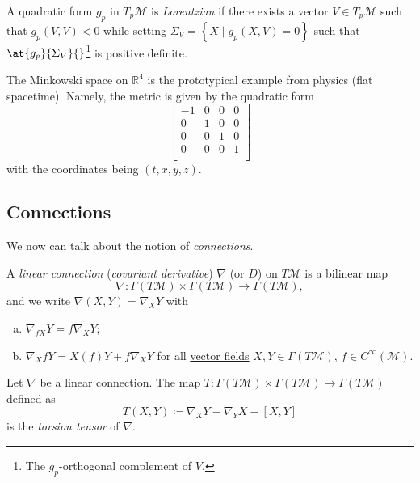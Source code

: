 \begin{definition}[Lorentzian]\label{def:Lorentzian}
	A quadratic form \(g_p\) in \(T_{p} \mathcal{M} \) is \emph{Lorentzian} if there exists a vector \(V\in T_p \mathcal{M} \) such that \(g_p(V, V) < 0\) while setting \(\Sigma _V = \left\{ X \mid g_p(X, V) = 0 \right\}\) such that \(\at{g_p}{\Sigma _V}{} \)\footnote{The \(g_p\)-orthogonal complement of \(V\).} is positive definite.
\end{definition}

\begin{eg}
	The Minkowski space on \(\mathbb{R} ^4\) is the prototypical example from physics (flat spacetime). Namely, the metric is given by the quadratic form
	\[
		\begin{bmatrix}
			-1 & 0 & 0 & 0 \\
			0  & 1 & 0 & 0 \\
			0  & 0 & 1 & 0 \\
			0  & 0 & 0 & 1 \\
		\end{bmatrix}
	\]
	with the coordinates being \((t, x, y, z)\).
\end{eg}

\subsection{Connections}
We now can talk about the notion of \emph{connections}.

\begin{definition}\label{def:linear-connection}
	A \emph{linear connection} (\emph{covariant derivative}) \(\nabla \) (or \(D\)) on \(T\mathcal{M} \) is a bilinear map
	\[
		\nabla \colon \Gamma (T \mathcal{M} ) \times \Gamma (T \mathcal{M} ) \to \Gamma (T \mathcal{M} ),
	\]
	and we write \(\nabla (X, Y) = \nabla _X Y\) with
	\begin{enumerate}[(a)]
		\item \(\nabla _{fX}Y = f \nabla _X Y\);
		\item \(\nabla _X fY = X(f)Y + f \nabla _X Y\) for all \hyperref[def:vector-field]{vector fields} \(X, Y\in \Gamma (T \mathcal{M} )\), \(f\in C^{\infty} (\mathcal{M} )\).
	\end{enumerate}
\end{definition}

\begin{definition}\label{def:torsion-tensor}
	Let \(\nabla \) be a \hyperref[def:linear-connection]{linear connection}. The map \(T\colon \Gamma (T \mathcal{M} )\times \Gamma (T \mathcal{M} )\to \Gamma (T \mathcal{M} )\) defined as
	\[
		T(X, Y) \coloneqq \nabla _X Y - \nabla _Y X - [X, Y]
	\]
	is the \emph{torsion tensor} of \(\nabla \).
\end{definition}

